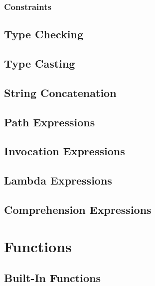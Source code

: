\documentclass[a4paper,oneside,12pt, extrafontsizes]{memoir}
\begin{document}
    \section{Constraints}
    

  \chapter{Type Checking}
  \label{ch:type-checking}
  

  \chapter{Type Casting}
  \label{ch:type-casting}
  

  \chapter{String Concatenation}
  \label{ch:string-concatenation}
  

  \chapter{Path Expressions}
  \label{ch:paths}
  

  \chapter{Invocation Expressions}
  \label{ch:invocations}
  

  \chapter{Lambda Expressions}
  \label{ch:lambdas}
  

  \chapter{Comprehension Expressions}
  \label{ch:comprehensions}
  

\part{Functions}

  \chapter{Built-In Functions}
  \label{ch:built-in-functions}
  
\end{document}
